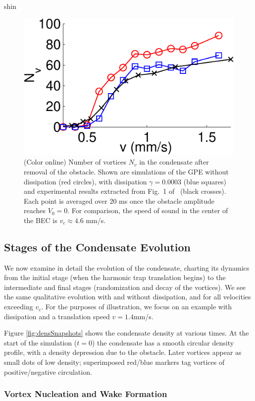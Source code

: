 \begin{chapter}{\label{cha:shin}shin}
\begin{figure}
\includegraphics[width=0.65\linewidth]{shin/fig1}
\caption{\label{fig:N_vV} (Color online) Number of vortices $N_v$ in the condensate after removal of the obstacle. Shown are simulations of the GPE without dissipation (red circles), with dissipation $\gamma = 0.0003$ (blue squares) and experimental results extracted from Fig.~1 of~\citep{kwon_moon_14} (black crosses). Each point is averaged over $20$ ms once the obstacle amplitude reaches $V_0=0$.  For comparison, the speed of sound in the center of the BEC is $v_c\approx 4.6$ mm/s.  }
\end{figure}

\subsection{Stages of the Condensate Evolution}

We now examine in detail the evolution of the condensate, 
charting its dynamics from the initial stage (when the
harmonic trap translation begins) to the intermediate and final stages 
(randomization and decay of the vortices).  We see the same 
qualitative evolution with and without dissipation, and for all 
velocities exceeding $v_c$.  For the purposes of illustration, 
we focus on an example with dissipation and a translation 
speed $v=1.4$mm/s.  

Figure \ref{fig:densSnapshots} shows the condensate density at various times. At the start of the simulation ($t=0$) the condensate has a smooth circular density profile, with a density depression due to the obstacle.  Later vortices appear as small dots of low density; superimposed red/blue markers tag vortices of positive/negative circulation.

\subsubsection{Vortex Nucleation and Wake Formation}


\end{chapter}
